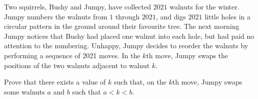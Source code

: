 Two squirrels, Bushy and Jumpy, have collected $2021$ walnuts for the winter.
Jumpy numbers the walnuts from $1$ through $2021$, and digs $2021$ little holes
in a circular pattern in the ground around their favourite tree.
The next morning Jumpy notices that Bushy had placed one walnut into each hole,
but had paid no attention to the numbering.
Unhappy, Jumpy decides to reorder the walnuts by performing a sequence of 2021 moves.
In the $k$th move, Jumpy swaps the positions of the two walnuts adjacent to walnut $k$.

Prove that there exists a value of $k$ such that, on the $k$th move,
Jumpy swaps some walnuts $a$ and $b$ such that $a<k<b$.